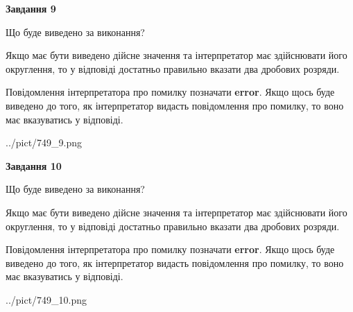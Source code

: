 \documentclass[12pt, ukrainian]{article}
\begin{document}
{\begin {Large}
{\begin {center}\textbf{Завдання 9}\end {center}}\par
Що буде виведено за виконання? \par

Якщо має бути виведено дійсне значення та інтерпретатор має здійснювати його округлення, 
то у відповіді достатньо правильно вказати два дробових розряди.

Повідомлення інтерпретатора про помилку позначати \textbf{error}.
Якщо щось буде виведено до того, як інтерпретатор видасть повідомлення про помилку, 
то воно має вказуватись у відповіді. \par

\begin{center}
	{../pict/749_9.png}
\end{center}
\newpage

{\begin {center}\textbf{Завдання 10}\end {center}}\par
Що буде виведено за виконання? \par

Якщо має бути виведено дійсне значення та інтерпретатор має здійснювати його округлення, 
то у відповіді достатньо правильно вказати два дробових розряди.

Повідомлення інтерпретатора про помилку позначати \textbf{error}.
Якщо щось буде виведено до того, як інтерпретатор видасть повідомлення про помилку, 
то воно має вказуватись у відповіді. \par

\begin{center}
	{../pict/749_10.png}
\end{center}
\newpage

\end {Large}}
\end{document}
